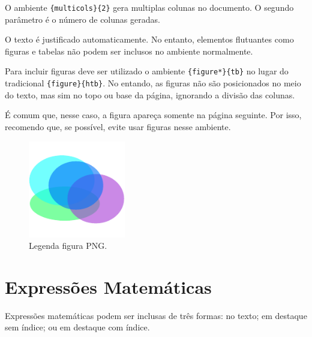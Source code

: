 
    \begin{multicols}{2}
        O ambiente \lstinline[language=TeX,style=code]|{multicols}{2}| gera multiplas colunas no documento.
        O segundo parâmetro é o número de colunas geradas.

        O texto é justificado automaticamente.
        No entanto, elementos flutuantes como figuras e tabelas não podem ser inclusos no ambiente normalmente.

        Para incluir figuras deve ser utilizado o ambiente \lstinline[language=TeX,style=code]|{figure*}{tb}| no lugar do tradicional \lstinline[language=TeX,style=code]|{figure}{htb}|.
        No entando, as figuras não são posicionados no meio do texto, mas sim no topo ou base da página, ignorando a divisão das colunas.

        É comum que, nesse caso, a figura apareça somente na página seguinte.
        Por isso, recomendo que, se possível, evite usar figuras nesse ambiente.


        \begin{figure}[bt]
            \centering
            \includegraphics[width=120pt]{images/figure.pdf}
            \caption{Legenda figura PNG.}
            \label{fig:coluna_dupla}
        \end{figure}
        
        \lipsum[1][1-10]
    \end{multicols}


\section{Expressões Matemáticas}
\label{sec:exmatematicas}

    Expressões matemáticas podem ser inclusas de três formas:
    no texto; em destaque sem índice; ou em destaque com índice.

